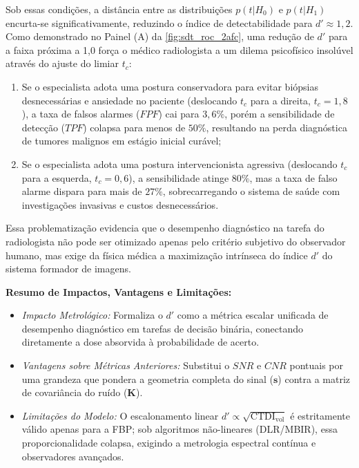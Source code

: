 \documentclass[
  12pt,
  a4paper,
  oneside
]{report}
\begin{document}
Sob essas condições, a distância entre as distribuições $p(t|H_0)$ e $p(t|H_1)$ encurta-se significativamente, reduzindo o índice de detectabilidade para $d' \approx 1{,}2$. Como demonstrado no Painel (A) da \cref{fig:sdt_roc_2afc}, uma redução de $d'$ para a faixa próxima a 1,0 força o médico radiologista a um dilema psicofísico insolúvel através do ajuste do limiar $t_c$:
\begin{enumerate}
  \item Se o especialista adota uma postura conservadora para evitar biópsias desnecessárias e ansiedade no paciente (deslocando $t_c$ para a direita, $t_c = 1{,}8$), a taxa de falsos alarmes ($FPF$) cai para $3{,}6\%$, porém a sensibilidade de detecção ($TPF$) colapsa para menos de $50\%$, resultando na perda diagnóstica de tumores malignos em estágio inicial curável;
  \item Se o especialista adota uma postura intervencionista agressiva (deslocando $t_c$ para a esquerda, $t_c = 0{,}6$), a sensibilidade atinge $80\%$, mas a taxa de falso alarme dispara para mais de $27\%$, sobrecarregando o sistema de saúde com investigações invasivas e custos desnecessários.
\end{enumerate}

Essa problematização evidencia que o desempenho diagnóstico na tarefa do radiologista não pode ser otimizado apenas pelo critério subjetivo do observador humano, mas exige da física médica a maximização intrínseca do índice $d'$ do sistema formador de imagens.

\noindent\textbf{Resumo de Impactos, Vantagens e Limitações:}
\begin{itemize}[leftmargin=*,noitemsep]
  \item \emph{Impacto Metrológico:} Formaliza o $d'$ como a métrica escalar unificada de desempenho diagnóstico em tarefas de decisão binária, conectando diretamente a dose absorvida à probabilidade de acerto.
  \item \emph{Vantagens sobre Métricas Anteriores:} Substitui o $SNR$ e $CNR$ pontuais por uma grandeza que pondera a geometria completa do sinal ($\mathbf{s}$) contra a matriz de covariância do ruído ($\mathbf{K}$).
  \item \emph{Limitações do Modelo:} O escalonamento linear $d' \propto \sqrt{\text{CTDI}_{\text{vol}}}$ é estritamente válido apenas para a FBP; sob algoritmos não-lineares (DLR/MBIR), essa proporcionalidade colapsa, exigindo a metrologia espectral contínua e observadores avançados.
\end{itemize}
\end{document}
